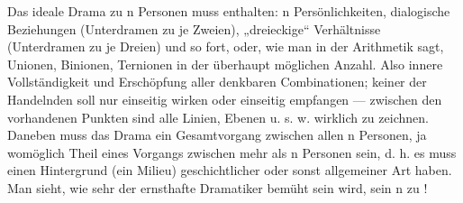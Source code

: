 Das ideale Drama zu n Personen muss enthalten: n Persönlichkeiten,  dialogische Beziehungen (Unterdramen zu je Zweien),  „dreieckige“ Verhältnisse (Unterdramen zu je Dreien) und so fort, oder, wie man in der Arithmetik sagt, Unionen, Binionen, Ternionen in der überhaupt möglichen Anzahl. Also innere Vollständigkeit und Erschöpfung aller denkbaren Combinationen; keiner der Handelnden soll nur einseitig wirken oder einseitig empfangen — zwischen den vorhandenen Punkten sind alle Linien, Ebenen u. s. w. wirklich zu zeichnen. Daneben muss das Drama ein Gesamtvorgang zwischen allen n Personen, ja womöglich Theil eines Vorgangs zwischen mehr als n Personen sein, d. h. es muss einen Hintergrund (ein Milieu) geschichtlicher oder sonst allgemeiner Art haben. Man sieht, wie sehr der ernsthafte Dramatiker bemüht sein wird, sein n zu !
\par

